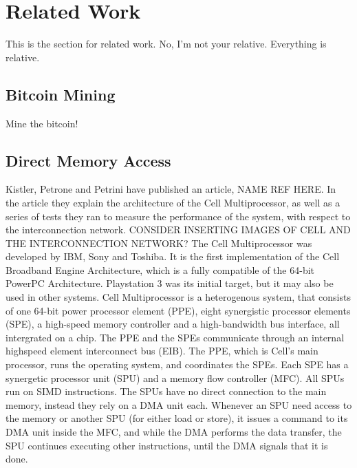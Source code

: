 \chapter{Related Work}
This is the section for related work. 
No, I'm not your relative. 
Everything is relative.

\section{Bitcoin Mining}

Mine the bitcoin!

\section{Direct Memory Access}

Kistler, Petrone and Petrini have published an article, NAME REF HERE. 
In the article they explain the architecture of the Cell Multiprocessor, as well as a series of tests they ran to measure the performance of the system, with respect to the interconnection network.
CONSIDER INSERTING IMAGES OF CELL AND THE INTERCONNECTION NETWORK?
The Cell Multiprocessor was developed by IBM, Sony and Toshiba.
It is the first implementation of the Cell Broadband Engine Architecture, which is a fully compatible of the 64-bit PowerPC Architecture.
Playstation 3 was its initial target, but it may also be used in other systems.
Cell Multiprocessor is a heterogenous system, that consists of one 64-bit power processor element (PPE), eight synergistic processor elements (SPE), a high-speed memory controller and a high-bandwidth bus interface, all intergrated on a chip. 
The PPE and the SPEs communicate through an internal highspeed element interconnect bus (EIB).
The PPE, which is Cell's main processor, runs the operating system, and coordinates the SPEs.
Each SPE has a synergetic processor unit (SPU) and a memory flow controller (MFC).
All SPUs run on SIMD instructions.
The SPUs have no direct connection to the main memory, instead they rely on a DMA unit each.
Whenever an SPU need access to the memory or another SPU (for either load or store), it issues a command to its DMA unit inside the MFC, and while the DMA performs the data transfer, the SPU continues executing other instructions, until the DMA signals that it is done.

